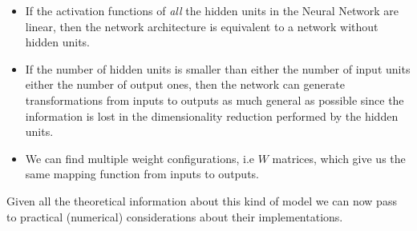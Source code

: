 \documentclass{standalone}
\begin{document}
\begin{itemize}

\item If the activation functions of \emph{all} the hidden units in the Neural Network are linear, then the network architecture is equivalent to a network without hidden units.

\item If the number of hidden units is smaller than either the number of input units either the number of output ones, then the network can generate transformations from inputs to outputs as much general as possible since the information is lost in the dimensionality reduction performed by the hidden units.

\item We can find multiple weight configurations, i.e $W$ matrices, which give us the same mapping function from inputs to outputs.

\end{itemize}

Given all the theoretical information about this kind of model we can now pass to practical (numerical) considerations about their implementations.
\end{document}
